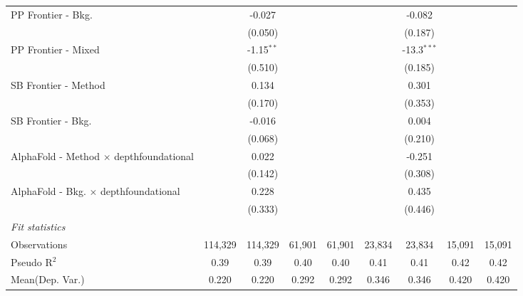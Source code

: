 \begin{tabular}{lcccccccc}
   PP Frontier - Bkg.                             &               & -0.027       &        &        &               & -0.082        &        &   \\   
                                                  &               & (0.050)      &        &        &               & (0.187)       &        &   \\   
   PP Frontier - Mixed                            &               & -1.15$^{**}$ &        &        &               & -13.3$^{***}$ &        &   \\   
                                                  &               & (0.510)      &        &        &               & (0.185)       &        &   \\   
   SB Frontier - Method                           &               & 0.134        &        &        &               & 0.301         &        &   \\   
                                                  &               & (0.170)      &        &        &               & (0.353)       &        &   \\   
   SB Frontier - Bkg.                             &               & -0.016       &        &        &               & 0.004         &        &   \\   
                                                  &               & (0.068)      &        &        &               & (0.210)       &        &   \\   
   AlphaFold - Method $\times$ depthfoundational  &               & 0.022        &        &        &               & -0.251        &        &   \\   
                                                  &               & (0.142)      &        &        &               & (0.308)       &        &   \\   
   AlphaFold - Bkg. $\times$ depthfoundational    &               & 0.228        &        &        &               & 0.435         &        &   \\   
                                                  &               & (0.333)      &        &        &               & (0.446)       &        &   \\   
   \midrule
   \emph{Fit statistics}\\
   Observations                                   & 114,329       & 114,329      & 61,901 & 61,901 & 23,834        & 23,834        & 15,091 & 15,091\\  
   Pseudo R$^2$                                   & 0.39          & 0.39         & 0.40   & 0.40   & 0.41          & 0.41          & 0.42   & 0.42\\  
Mean(Dep. Var.) & 0.220 & 0.220 & 0.292 & 0.292 & 0.346 & 0.346 & 0.420 & 0.420 \\
   

\end{tabular}
